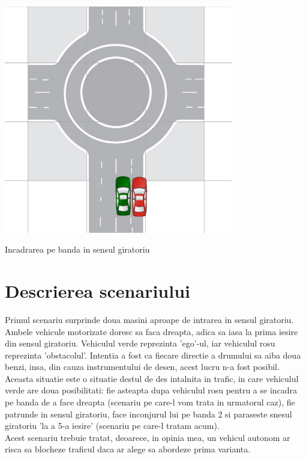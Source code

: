 \documentclass[a4paper,12pt]{report}
\begin{document}
\begin{center}
\includegraphics[width=10cm]{fig/scenariul1}
\end{center}
\begin{center}
Incadrarea pe banda in sensul giratoriu
\end{center}

\section{Descrierea scenariului}
Primul scenariu surprinde doua masini aproape de intrarea in sensul giratoriu. Ambele vehicule motorizate doresc sa faca dreapta, adica sa iasa la prima iesire din sensul giratoriu. Vehiculul verde reprezinta 'ego'-ul, iar vehiculul rosu reprezinta 'obstacolul'. Intentia a fost ca fiecare directie a drumului sa aiba doua benzi, insa, din cauza instrumentului de desen, acest lucru n-a fost posibil. \\
Aceasta situatie este o situatie destul de des intalnita in trafic, in care vehiculul verde are doua posibilitati: fie asteapta dupa vehiculul rosu pentru a se incadra pe banda de a face dreapta (scenariu pe care-l vom trata in urmatorul caz), fie patrunde in sensul giratoriu, face inconjurul lui pe banda 2 si paraseste snesul giratoriu 'la a 5-a iesire' (scenariu pe care-l tratam acum). \\
Acest scenariu trebuie tratat, deoarece, in opinia mea, un vehicul autonom ar risca sa blocheze traficul daca ar alege sa abordeze prima varianta. \\
\end{document}
